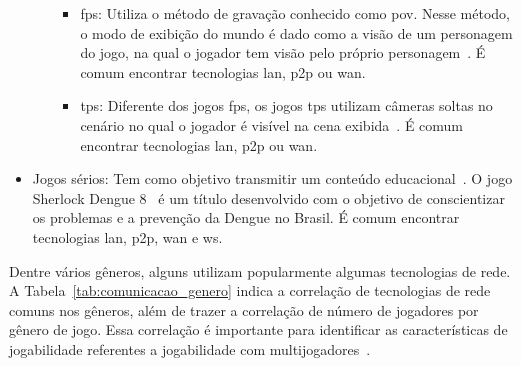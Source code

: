 \begin{itemize}
\begin{itemize}
        \begin{itemize}
          \item \ac{fps}: Utiliza o método de gravação conhecido como \ac{pov}. Nesse método, o modo de exibição do mundo é dado como a visão de um personagem do jogo, na qual o jogador tem visão pelo próprio personagem~\cite{video_game_technologies, adams_1208533}. É comum encontrar tecnologias \ac{lan}, \ac{p2p} ou \ac{wan}.
          \item \ac{tps}: Diferente dos jogos \ac{fps}, os jogos \ac{tps} utilizam câmeras soltas no cenário no qual o jogador é visível na cena exibida~\cite{video_game_technologies, adams_1208533}. É comum encontrar tecnologias \ac{lan}, \ac{p2p} ou \ac{wan}.
        \end{itemize}
    \end{itemize}
  \item Jogos sérios: Tem como objetivo transmitir um conteúdo educacional~\cite{video_game_technologies}. O jogo Sherlock Dengue 8~\cite{sherlock_dengue} é um título desenvolvido com o objetivo de conscientizar os problemas e a prevenção da Dengue no Brasil. É comum encontrar tecnologias \ac{lan}, \ac{p2p}, \ac{wan} e \ac{ws}.
\end{itemize}


Dentre vários gêneros, alguns utilizam popularmente algumas tecnologias de rede.
%
A Tabela~\ref{tab:comunicacao_genero} indica a correlação de tecnologias de rede comuns nos gêneros, além de trazer a correlação de número de jogadores por gênero de jogo.
%
Essa correlação é importante para identificar as características de jogabilidade referentes a jogabilidade com multijogadores~\cite{video_game_technologies}.


